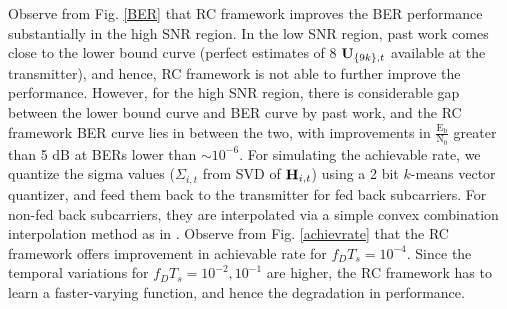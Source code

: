 \documentclass[conference]{IEEEtran}
\begin{document}
{Observe from Fig. \ref{BER} that RC framework improves the BER performance substantially in the high SNR region. In the low SNR region, past work \cite{6891198} comes close to the lower bound curve (perfect estimates of 8 ${\bf U}_{\{9k\},t}$ available at the transmitter), and hence, RC framework is not able to further improve the performance. However, for the high SNR region, there is considerable gap between the lower bound curve and BER curve by past work, and the RC framework BER curve lies in between the two, with improvements in $\frac{\text{E}_\text{b}}{\text{N}_0}$ greater than 5 dB at BERs lower than $\sim 10^{-6}$.  
For simulating the achievable rate, we quantize the sigma values ($\Sigma_{i,t}$ from SVD of ${\bf H}_{i,t}$) using a 2 bit $k$-means vector quantizer, and feed them back to the transmitter for fed back subcarriers. For non-fed back subcarriers, they are interpolated via a simple convex combination interpolation method as in \cite{Gupt1905:Predictive}. Observe from Fig. \ref{achievrate} that the RC framework offers improvement in achievable rate for $f_DT_s=10^{-4}$. Since the temporal variations for $f_DT_s=10^{-2}, 10^{-1}$ are higher, the RC framework has to learn a faster-varying function, and hence the degradation in performance. 
\vspace{-3pt}

}
\end{document}

